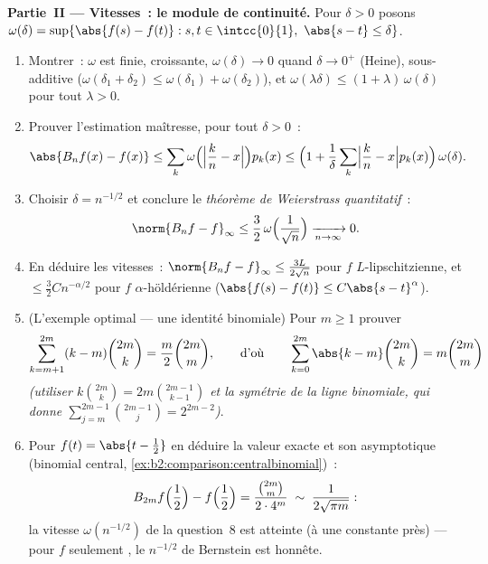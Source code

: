 \begin{problem}
\medskip
\noindent\textbf{Partie~II --- Vitesses~: le module de continuité.}
Pour $\delta > 0$ posons $\omega(\delta) = \sup\{\abs{f(s) - f(t)}
: s, t \in \intcc{0}{1},\ \abs{s - t} \leq \delta\}$.
\begin{enumerate}[resume]
  \item Montrer~: $\omega$ est finie, croissante,
        $\omega(\delta) \to 0$ quand $\delta \to 0^+$ (Heine),
        sous-additive ($\omega(\delta_1 + \delta_2) \leq
        \omega(\delta_1) + \omega(\delta_2)$), et
        $\omega(\lambda\delta) \leq (1 +
        \lambda)\,\omega(\delta)$ pour tout $\lambda > 0$.
  \item Prouver l'estimation maîtresse, pour tout $\delta > 0$~:
        \[
        \abs{B_nf(x) - f(x)}
        \leq \sum_k \omega\Bigl(\Bigl|\frac kn -
        x\Bigr|\Bigr)p_k(x)
        \leq \Bigl(1 + \frac1\delta\sum_k\Bigl|\frac kn -
        x\Bigr|p_k(x)\Bigr)\,\omega(\delta) .
        \]
  \item Choisir $\delta = n^{-1/2}$ et conclure le
        \emph{théorème de Weierstrass quantitatif}~:
        \[
        \norm{B_nf - f}_\infty \leq
        \frac32\,\omega\Bigl(\frac{1}{\sqrt n}\Bigr)
        \xrightarrow[n\to\infty]{} 0 .
        \]
  \item En déduire les vitesses~: $\norm{B_nf - f}_\infty \leq
        \frac{3L}{2\sqrt n}$ pour $f$ $L$-lipschitzienne, et $\leq
        \frac32 C n^{-\alpha/2}$ pour $f$ $\alpha$-höldérienne
        ($\abs{f(s) - f(t)} \leq C\abs{s-t}^\alpha$).
  \item (L'exemple optimal --- une identité binomiale) Pour $m
        \geq 1$ prouver
        \[
        \sum_{k=m+1}^{2m} (k - m)\binom{2m}{k}
        = \frac{m}{2}\binom{2m}{m},
        \qquad\text{d'où}\qquad
        \sum_{k=0}^{2m}\abs{k - m}\binom{2m}{k}
        = m\binom{2m}{m}
        \]
        \emph{(utiliser $k\binom{2m}k = 2m\binom{2m-1}{k-1}$ et la
        symétrie de la ligne binomiale, qui donne
        $\sum_{j=m}^{2m-1}\binom{2m-1}{j} = 2^{2m-2}$)}.
  \item Pour $f(t) = \abs{t - \frac12}$ en déduire la valeur exacte
        et son asymptotique (binomial central,
        \cref{ex:b2:comparison:centralbinomial})~:
        \[
        B_{2m}f\Bigl(\frac12\Bigr) - f\Bigl(\frac12\Bigr)
        = \frac{\binom{2m}{m}}{2\cdot4^{m}}
        \;\sim\; \frac{1}{2\sqrt{\pi m}} :
        \]
        la vitesse $\omega(n^{-1/2})$ de la question~8 est atteinte
        (à une constante près) --- pour $f$ seulement ,
        le $n^{-1/2}$ de Bernstein est honnête.
\end{enumerate}


\end{problem}
